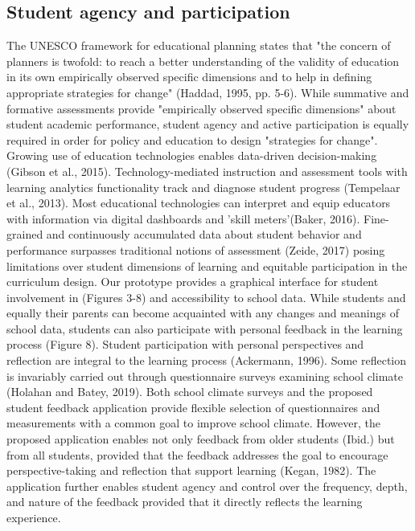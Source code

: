 \documentclass{article}
\begin{document}
\subsection{Student agency and participation}
The UNESCO framework for educational planning states that "the concern of planners is twofold: to reach a better understanding of the validity of education in its own empirically observed specific dimensions and to help in defining appropriate strategies for change" (Haddad, 1995, pp. 5-6).
\bigbreak
While summative and formative assessments provide "empirically observed specific dimensions" about student academic performance, student agency and active participation is equally required in order for policy and education to design "strategies for change". Growing use of education technologies enables data-driven decision-making (Gibson et al., 2015). Technology-mediated instruction and assessment tools with learning analytics functionality track and diagnose student progress (Tempelaar et al., 2013). Most educational technologies can interpret and equip educators with information via digital dashboards and 'skill meters'(Baker, 2016). Fine-grained and continuously accumulated data about student behavior and performance surpasses traditional notions of assessment (Zeide, 2017) posing limitations over student dimensions of learning and equitable participation in the curriculum design.
\bigbreak
Our prototype provides a graphical interface for student involvement in (Figures 3-8) and accessibility to school data. While students and equally their parents can become acquainted with any changes and meanings of school data, students can also participate with personal feedback in the learning process (Figure 8). Student participation with personal perspectives and reflection are integral to the learning process (Ackermann, 1996). Some reflection is invariably carried out through questionnaire surveys examining school climate (Holahan and Batey, 2019). Both school climate surveys and the proposed student feedback application provide flexible selection of questionnaires and measurements with a common goal to improve school climate. However, the proposed application enables not only feedback from older students (Ibid.) but from all students, provided that the feedback addresses the goal to encourage perspective-taking and reflection that support learning (Kegan, 1982). The application further enables student agency and control over the frequency, depth, and nature of the feedback provided that it directly reflects the learning experience.
\end{document}
